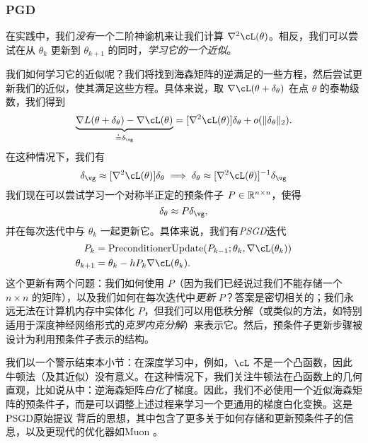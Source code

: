 \documentclass[../../book-main.tex]{subfiles}
\begin{document}
\subsubsection{PGD}

在实践中，我们\textit{没有}一个二阶神谕机来让我们计算 \(\nabla^{2}\cL(\theta)\)。相反，我们可以尝试在从 \(\theta_{k}\) 更新到 \(\theta_{k + 1}\) 的同时，\textit{学习它的一个近似}。

我们如何学习它的近似呢？我们将找到海森矩阵的逆满足的一些方程，然后尝试更新我们的近似，使其满足这些方程。具体来说，取 \(\nabla \cL(\theta + \delta_{\theta})\) 在点 \(\theta\) 的泰勒级数，我们得到
\begin{equation}
    \underbrace{\nabla L(\theta + \delta_{\theta}) - \nabla \cL(\theta)}_{\doteq \delta_{\vg}} = [\nabla^{2} \cL(\theta)]\delta_{\theta} + o(\norm{\delta_{\theta}}_{2}).
\end{equation}
在这种情况下，我们有
\begin{equation}
    \delta_{\vg} \approx [\nabla^{2}\cL(\theta)]\delta_{\theta} \implies \delta_{\theta} \approx [\nabla^{2}\cL(\theta)]^{-1}\delta_{\vg}
\end{equation}
我们现在可以尝试学习一个对称半正定的预条件子 \(P \in \mathbb{R}^{n \times n}\)，使得
\begin{equation}
    \delta_{\theta} \approx P\delta_{\vg},
\end{equation}
并在每次迭代中与 \(\theta_{k}\) 一起更新它。具体来说，我们有\textit{PSGD}迭代
\begin{align}
    P_{k}
    &= \mathrm{PreconditionerUpdate}(P_{k - 1}; \theta_{k}, \nabla \cL(\theta_{k})) \\ 
    \theta_{k + 1}
    &= \theta_{k} - hP_{k}\nabla \cL(\theta_{k}).
\end{align}
这个更新有两个问题：我们如何使用 \(P\)（因为我们已经说过我们不能存储一个 \(n \times n\) 的矩阵），以及我们如何在每次迭代中\textit{更新} \(P\)？答案是密切相关的；我们永远无法在计算机内存中实体化 \(P\)，但我们可以用低秩分解（或类似的方法，如特别适用于深度神经网络形式的\textit{克罗内克分解}）来表示它。然后，预条件子更新步骤被设计为利用预条件子表示的结构。

我们以一个警示结束本小节：在深度学习中，例如，\(\cL\) 不是一个凸函数，因此牛顿法（及其近似）没有意义。在这种情况下，我们关注牛顿法在凸函数上的几何直观，比如说从中：逆海森矩阵\textit{白化}了梯度。因此，我们不必使用一个近似海森矩阵的预条件子，而是可以调整上述过程来学习一个更通用的梯度白化变换。这是PSGD原始提议 \cite{li2017preconditioned} 背后的思想，其中包含了更多关于如何存储和更新预条件子的信息，以及更现代的优化器如Muon \cite{liu2025muon}。
\end{document}
